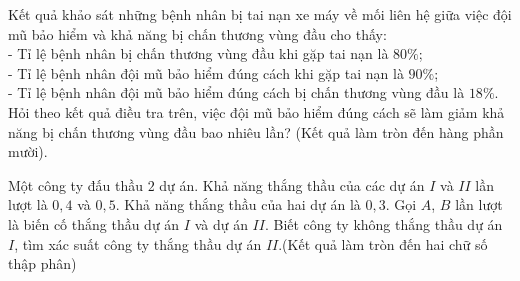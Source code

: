 \begin{ex}%
	Kết quả khảo sát những bệnh nhân bị tai nạn xe máy về mối liên hệ giữa việc đội mũ bảo hiểm và khả năng bị chấn thương vùng đầu cho thấy:\\
	- Tỉ lệ bệnh nhân bị chấn thương vùng đầu khi gặp tai nạn là $80 \%$;\\
	- Tỉ lệ bệnh nhân đội mũ bảo hiểm đúng cách khi gặp tai nạn là $90 \%$;\\
	- Tỉ lệ bệnh nhân đội mũ bảo hiểm đúng cách bị chấn thương vùng đầu là $18 \%$.\\
	Hỏi theo kết quả điều tra trên, việc đội mũ bảo hiểm đúng cách sẽ làm giảm khả năng bị chấn thương vùng đầu bao nhiêu lần? (Kết quả làm tròn đến hàng phần mười).
\end{ex} 
\begin{ex}%
	Một công ty đấu thầu $2$ dự án. Khả năng thắng thầu của các dự án $I$ và $II$ lần lượt là $0{,}4$ và $0{,}5$. Khả năng thắng thầu của hai dự án là $0{,}3$. Gọi $A$, $B$ lần lượt là biến cố thắng thầu dự án $I$ và dự án $II$. Biết công ty không thắng thầu dự án $I$, tìm xác suất công ty thắng thầu dự án $II$.(Kết quả làm tròn đến hai chữ số thập phân)
\end{ex}
